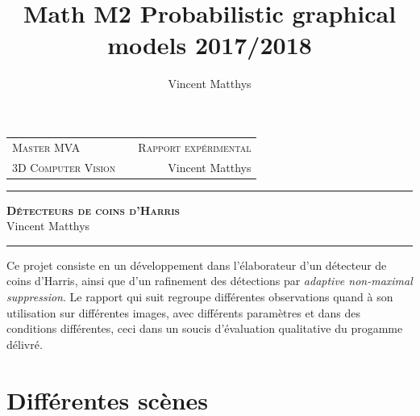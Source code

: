 \documentclass[12pt,a4paper,onecolumn]{article}
\title{Math M2 Probabilistic graphical models 2017/2018}
\author{Vincent Matthys}
\begin{document}
\begin{tabularx}{0.8\textwidth}{@{} l X r @{} }
	{\textsc{Master MVA}}       &  & \textsc{Rapport expérimental} \\
	\textsc{3D Computer Vision} &  & {Vincent Matthys}             \\
\end{tabularx}
\vspace{1.5cm}
\begin{center}
	\rule[11pt]{5cm}{0.5pt}

	\textbf{\LARGE \textsc{Détecteurs de coins d'Harris}}
	\vspace{0.5cm}\\
	Vincent Matthys\\
	\rule{5cm}{0.5pt}
	\vspace{1.5cm}
\end{center}

Ce projet consiste en un développement dans l'élaborateur d'un détecteur de coins d'Harris, ainsi que d'un rafinement des détections par \textit{adaptive non-maximal suppression}. Le rapport qui suit regroupe différentes observations quand à son utilisation sur différentes images, avec différents paramètres et dans des conditions différentes, ceci dans un soucis d'évaluation qualitative du progamme délivré.

\tableofcontents
\section{Différentes scènes}
\end{document}
